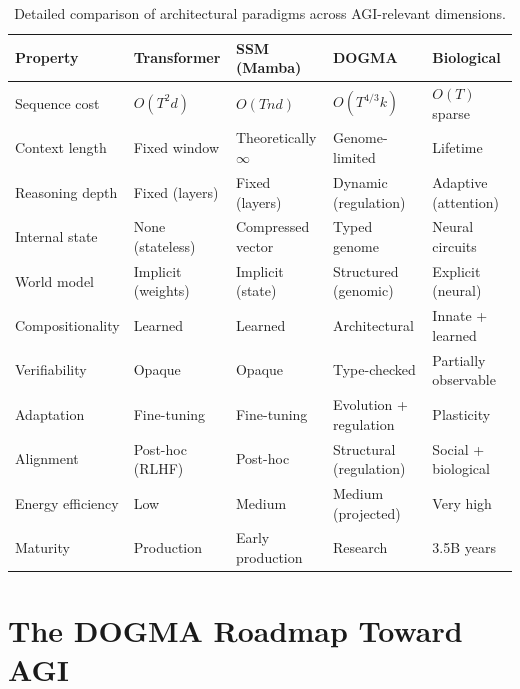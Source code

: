 
\begin{table}[htbp]
\centering
\caption{Detailed comparison of architectural paradigms across AGI-relevant dimensions.}
\label{tab:architecture-comparison}
\renewcommand{\arraystretch}{1.25}
\small
\begin{tabular}{p{2.8cm}p{2.5cm}p{2.5cm}p{2.8cm}p{2.8cm}}
\toprule
\textbf{Property} & \textbf{Transformer} & \textbf{SSM (Mamba)} & \textbf{DOGMA} & \textbf{Biological} \\
\midrule
Sequence cost & $O(T^2 d)$ & $O(T n d)$ & $O(T^{4/3} k)$ & $O(T)$ sparse \\
\addlinespace
Context length & Fixed window & Theoretically $\infty$ & Genome-limited & Lifetime \\
\addlinespace
Reasoning depth & Fixed (layers) & Fixed (layers) & Dynamic (regulation) & Adaptive (attention) \\
\addlinespace
Internal state & None (stateless) & Compressed vector & Typed genome & Neural circuits \\
\addlinespace
World model & Implicit (weights) & Implicit (state) & Structured (genomic) & Explicit (neural) \\
\addlinespace
Compositionality & Learned & Learned & Architectural & Innate + learned \\
\addlinespace
Verifiability & Opaque & Opaque & Type-checked & Partially observable \\
\addlinespace
Adaptation & Fine-tuning & Fine-tuning & Evolution + regulation & Plasticity \\
\addlinespace
Alignment & Post-hoc (RLHF) & Post-hoc & Structural (regulation) & Social + biological \\
\addlinespace
Energy efficiency & Low & Medium & Medium (projected) & Very high \\
\addlinespace
Maturity & Production & Early production & Research & 3.5B years \\
\bottomrule
\end{tabular}
\end{table}

\section{The DOGMA Roadmap Toward AGI}
\label{sec:dogma-roadmap}

